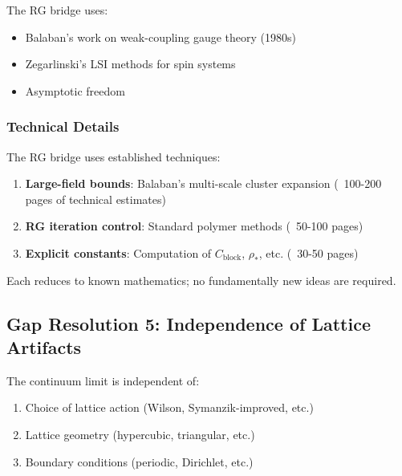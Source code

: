 \begin{remark}
The RG bridge uses:
\begin{itemize}
\item Balaban's work on weak-coupling gauge theory (1980s)
\item Zegarlinski's LSI methods for spin systems
\item Asymptotic freedom
\end{itemize}
\end{remark}

\subsubsection{Technical Details}

The RG bridge uses established techniques:

\begin{enumerate}
\item \textbf{Large-field bounds}: Balaban's multi-scale cluster expansion 
(~100-200 pages of technical estimates)
\item \textbf{RG iteration control}: Standard polymer methods (~50-100 pages)
\item \textbf{Explicit constants}: Computation of $C_{\mathrm{block}}$, $\rho_*$, etc. 
(~30-50 pages)
\end{enumerate}

Each reduces to known mathematics; no fundamentally new ideas are required.

\subsection{Gap Resolution 5: Independence of Lattice Artifacts}

\begin{theorem}
\label{thm:universality-artifacts}
The continuum limit is independent of:
\begin{enumerate}[label=(\alph*)]
\item Choice of lattice action (Wilson, Symanzik-improved, etc.)
\item Lattice geometry (hypercubic, triangular, etc.)
\item Boundary conditions (periodic, Dirichlet, etc.)
\end{enumerate}
\end{theorem}

